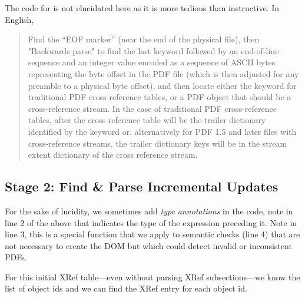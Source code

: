 The code for  is
not elucidated here as it is more tedious than instructive.
In English,
\begin{quote}
Find the ``EOF marker''  (near the end of the physical
file), then "Backwards parse" to find the last 
keyword followed by an end-of-line sequence and an integer value
encoded as a sequence of ASCII bytes representing the byte offset in
the PDF file (which is then adjusted for any preamble to a physical
byte offset), and then locate either the  keyword for
traditional PDF cross-reference tables, or a PDF object that should be
a cross-reference stream.  In the case of traditional PDF
cross-reference tables, after the cross reference table will be the
trailer dictionary identified by the  keyword or,
alternatively for PDF 1.5 and later files with cross-reference
streams, the trailer dictionary keys will be in the stream extent
dictionary of the cross reference stream.
\end{quote}

\subsection{Stage 2: Find \& Parse Incremental Updates}

\lstset{numbers=right}
\lstset{numbers=none}

For the sake of lucidity, we sometimes add \emph{type annotations} in
the code, note in line 2 of the above that 
indicates the type of the expression preceding it.
%
Note  in line 3, this is a special function that we apply to
semantic checks (line 4) that are not necessary to create the DOM but which
could detect invalid or inconsistent PDFs.

For this initial XRef table---even without parsing XRef subsections---we
know the list of object ids and we can find the XRef entry for each object id.

